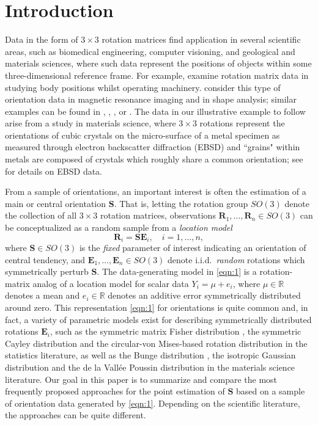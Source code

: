 \section{Introduction}\label{ch:intro}

Data in the form of $3 \times 3$ rotation matrices find application in several scientific areas, 
such as biomedical engineering, computer visioning, and geological and materials sciences, where such data represent the positions of objects within some three-dimensional
reference frame.  For example, \citet{rancourt00} examine rotation matrix data in studying body 
positions whilst operating machinery. \cite{fletcher09} consider this type of  orientation data in 
magnetic resonance imaging and in shape analysis; similar examples  can be found in \cite{schwartz05}, \cite{pierrynowski09},  \cite{dai10},  or \cite{hadani11}.  The data in our illustrative 
example to follow arise from a study in materials science, where $3 \times 3$ rotations represent the orientations of cubic crystals on the micro-surface of a metal specimen as measured through electron backscatter diffraction (EBSD) and ``grains" within metals are composed of crystals which roughly share a common orientation; see \cite{randle03} for details on EBSD data.  
     
From a sample of orientations, an important interest is often the estimation of a main or central orientation $\bm S$.  That is, letting the rotation group $SO(3)$ denote the collection of all $3\times 3$ rotation matrices, observations $\bm{R}_1,\ldots,\bm{R}_n \in SO(3)$ can be conceptualized as a random sample from a \textit{location model}
\begin{equation}
\label{eqn:1}
\mathbf{R}_i = \bm{S} \bm{E}_i, \quad i=1,\ldots,n,
\end{equation}
where $\bm S \in SO(3)$ is the {\it fixed} parameter of interest indicating an orientation of central tendency, and $\bm{E}_1,\ldots,\bm{E}_n \in SO(3)$ denote i.i.d.~{\it random} rotations which symmetrically perturb $\bm{S}$. The data-generating model in \eqref{eqn:1} is a rotation-matrix analog of a location model for scalar data $Y_i = \mu + e_i$, where $\mu \in \mathbb{R}$ denotes a mean and $e_i \in \mathbb{R}$ denotes an additive error symmetrically distributed around zero.  This representation \eqref{eqn:1} for orientations is quite common and, in fact,
a variety of parametric models exist for describing symmetrically distributed rotations $\bm{E}_i$, such as the symmetric matrix Fisher distribution \citep{downs72}, the symmetric Cayley distribution
\citep{leon06}  and the circular-von Mises-based rotation distribution \citep{bingham09}   in the statistics literature, as well as the Bunge distribution \citep{bunge82}, the isotropic Gaussian
distribution \citep{matthies88, savyolova95} and the de la Vall\'{e}e Poussin distribution \citep{Schaeben97} in the materials science literature. Our goal in this paper is to summarize and compare the most frequently proposed approaches for the point estimation of $\bm S$ based on a sample of orientation data generated by \eqref{eqn:1}.  Depending on the scientific literature, the approaches can be quite different.

